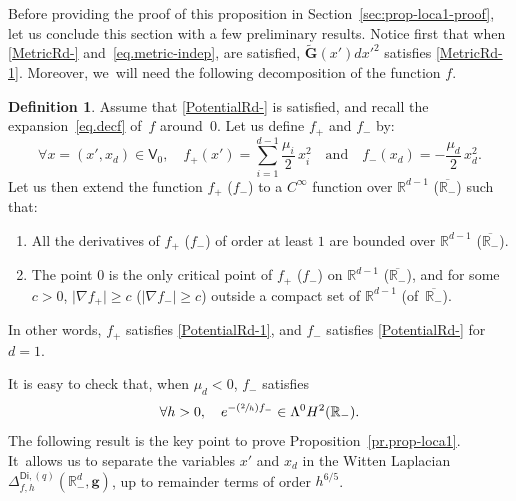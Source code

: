 \documentclass[10pt]{amsart}
\newcommand{\Psfrac}[2]{(\sfrac{#1}{#2})}
\newcommand{\quand}{\quad\text{and}\quad}
\newcommand{\mbf}[1]{\mathbf{#1}}
\theoremstyle{plain}
\theoremstyle{definition}
\newtheorem{definition}[proposition]{Definition}
\begin{document}
Before providing the proof of this proposition in
Section~\ref{sec:prop-loca1-proof}, let us conclude
this section with a few preliminary results. Notice first that when \ref{MetricRd-} and~\eqref{eq.metric-indep}, are
satisfied, $\tilde{\mbf G}(x') dx'^2$ satisfies
\ref{MetricRd-1}. Moreover, we~will need the following decomposition of the
function $f$.

\begin{definition}\label{de.pre1}
Assume that \ref{PotentialRd-} is satisfied, and recall the
expansion~\eqref{eq.decf} of~$f$ around~$0$.
Let us define $f_+$ and $f_-$ by:
\begin{equation}\label{eq.plusmoins}
\forall x=(x',x_d)\in \mathsf V_0,\quad f_+(x')= \sum_{i=1}^{ d-1}\frac{\mu_i}{2} \, x_i^2 \quand f_-(x_d)=-\frac{\mu_{d}}{2}\, x_d^2.
\end{equation}
Let us then extend the function $f_+$ (\resp $f_-$) to a $C^\infty$
function over $ {\mathbb R^{d-1}}$ (\resp $\overline{\mathbb R_-}$)
such that:
\begin{enumerate}
\item\label{de.pre11}
All the derivatives of $f_+$ (\resp $f_-$) of order at least $1$
are bounded over $ {\mathbb R^{d-1}}$ (\resp $\overline{\mathbb R_-}$).
\item\label{de.pre12}
The point $0$ is the only critical point of $f_+$ (\resp $f_-$) on $ {\mathbb R^{d-1}}$ (\resp $\overline{\mathbb R_-}$), and for some $c>0$, $\vert \nabla f_+\vert \ge c$ (\resp $\vert \nabla f_-\vert \ge c$) outside a compact set of $ {\mathbb R^{d-1}}$ (\resp of~$\overline{\mathbb R_-}$).
\end{enumerate}
In other words, $f_+$ satisfies \ref{PotentialRd-1}, and $f_-$ satisfies \ref{PotentialRd-} for $d=1$.
\end{definition}

It is easy to check that, when $\mu_{d}<0$, $f_-$ satisfies
\begin{equation}\label{eq.f-ext}
\forall h>0,\quad e^{-\Psfrac 2h f_-}\in \Lambda^0H^2(\mathbb R_-).
\end{equation}
The following result is the key point to prove Proposition~\ref{pr.prop-loca1}. It~allows us to separate the variables $x'$ and $x_d$ in the Witten
Laplacian $\Delta_{f,h}^{\mathsf{Di},(q)}(\mathbb R^d_-, \mbf g)$, up
to remainder terms of order $h^{6/5}$.
\end{document}
